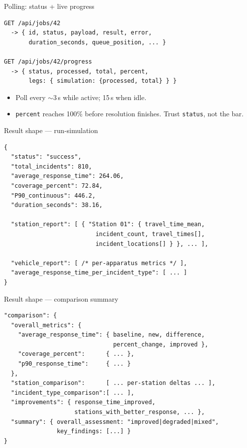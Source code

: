 \documentclass[aspectratio=169,11pt]{beamer}
\begin{document}
\begin{frame}[fragile]{Polling: status + live progress}
\begin{lstlisting}[language=shell]
GET /api/jobs/42
  -> { id, status, payload, result, error,
       duration_seconds, queue_position, ... }

GET /api/jobs/42/progress
  -> { status, processed, total, percent,
       legs: { simulation: {processed, total} } }
\end{lstlisting}
\vspace{4pt}
\begin{itemize}\setlength\itemsep{4pt}
  \item Poll every \(\sim\)3\,s while active; 15\,s when idle.
  \item \texttt{percent} reaches 100\% before resolution finishes. Trust \texttt{status}, not the bar.
\end{itemize}
\end{frame}

\begin{frame}[fragile]{Result shape — run-simulation}
\begin{lstlisting}[basicstyle=\ttfamily\scriptsize]
{
  "status": "success",
  "total_incidents": 810,
  "average_response_time": 264.06,
  "coverage_percent": 72.84,
  "P90_continuous": 446.2,
  "duration_seconds": 38.16,

  "station_report": [ { "Station 01": { travel_time_mean,
                          incident_count, travel_times[],
                          incident_locations[] } }, ... ],

  "vehicle_report": [ /* per-apparatus metrics */ ],
  "average_response_time_per_incident_type": [ ... ]
}
\end{lstlisting}
\end{frame}

\begin{frame}[fragile]{Result shape — comparison summary}
\begin{lstlisting}[basicstyle=\ttfamily\scriptsize]
"comparison": {
  "overall_metrics": {
    "average_response_time": { baseline, new, difference,
                               percent_change, improved },
    "coverage_percent":      { ... },
    "p90_response_time":     { ... }
  },
  "station_comparison":      [ ... per-station deltas ... ],
  "incident_type_comparison":[ ... ],
  "improvements": { response_time_improved,
                    stations_with_better_response, ... },
  "summary": { overall_assessment: "improved|degraded|mixed",
               key_findings: [...] }
}
\end{lstlisting}
\end{frame}
\end{document}
